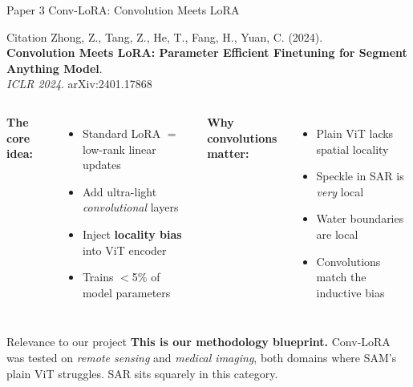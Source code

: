 \documentclass[10pt,aspectratio=169]{beamer}
\begin{document}
\begin{frame}{Paper 3 \quad Conv-LoRA: Convolution Meets LoRA}
\begin{block}{Citation}
Zhong, Z., Tang, Z., He, T., Fang, H., Yuan, C. (2024). \\
\textbf{Convolution Meets LoRA: Parameter Efficient Finetuning for Segment Anything Model}. \\
\textit{ICLR 2024}. \quad \textcolor{primaryblue}{arXiv:2401.17868}
\end{block}

\begin{columns}[T,onlytextwidth]
\textbf{The core idea:}
\begin{itemize}
\item Standard LoRA $=$ low-rank linear updates
\item Add ultra-light \textit{convolutional} layers
\item Inject \textbf{locality bias} into ViT encoder
\item Trains $<$5\% of model parameters
\end{itemize}

\textbf{Why convolutions matter:}
\begin{itemize}
\item Plain ViT lacks spatial locality
\item Speckle in SAR is \textit{very} local
\item Water boundaries are local
\item Convolutions match the inductive bias
\end{itemize}
\end{columns}

\vspace{0.5em}
\begin{alertblock}{Relevance to our project}
\textbf{This is our methodology blueprint.} Conv-LoRA was tested on \textit{remote sensing} and \textit{medical imaging}, both domains where SAM's plain ViT struggles. SAR sits squarely in this category.
\end{alertblock}
\end{frame}
\end{document}

